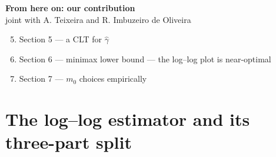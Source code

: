 \documentclass[10pt, aspectratio=169, xcolor={table}]{beamer}
\begin{document}
\begin{frame}[plain]
  \vfill
  \begin{center}
    {\Large\bfseries\color{DarkBlue} From here on: our contribution}\\[1em]
    {\large joint with A. Teixeira and R. Imbuzeiro de Oliveira}\\[2em]
    \footnotesize
      \begin{enumerate}\setcounter{enumi}{4}
        \item Section 5 --- a CLT for $\hat\gamma$
        \item Section 6 --- minimax lower bound --- the log--log plot is near-optimal
        \item Section 7 --- $m_0$ choices empirically
      \end{enumerate}
  \end{center}
  \vfill
\end{frame}

\section{The log--log estimator and its three-part split}
\end{document}
